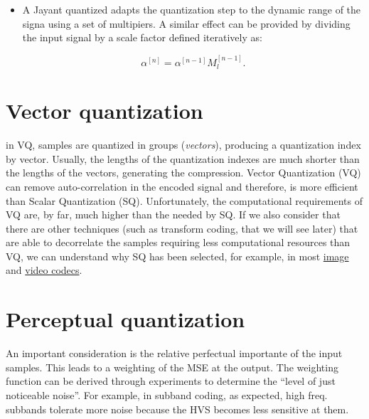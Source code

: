 \begin{itemize}
\item
  A Jayant quantized adapts the quantization step to the dynamic range
  of the signa using a set of multipiers. A similar effect can be
  provided by dividing the input signal by a scale factor defined
  iteratively as:

  \begin{equation}
    \alpha^{[n]} = \alpha^{[n-1]}M_l^{[n-1]}.
  \end{equation}
\end{itemize}


\section{Vector quantization}

in VQ, samples are quantized in groups (\emph{vectors}), producing a
quantization index by vector.  Usually, the lengths of the
quantization indexes are much shorter than the lengths of the vectors,
generating the compression. Vector Quantization (VQ) can remove
auto-correlation in the encoded signal and therefore, is more
efficient than Scalar Quantization (SQ). Unfortunately, the
computational requirements of VQ are, by far, much higher than the
needed by SQ. If we also consider that there are other techniques
(such as transform coding, that we will see later) that are able to
decorrelate the samples requiring less computational resources than
VQ, we can understand why SQ has been selected, for example, in most
\href{https://en.wikipedia.org/wiki/Image_compression}{image} and
\href{https://en.wikipedia.org/wiki/Video_coding_format}{video
  codecs}.


\section{Perceptual quantization}

An important consideration is the relative perfectual importante of
the input samples. This leads to a weighting of the MSE at the
output. The weighting function can be derived through experiments to
determine the ``level of just noticeable noise''. For example, in
subband coding, as expected, high freq. subbands tolerate more noise
because the HVS becomes less sensitive at them.



